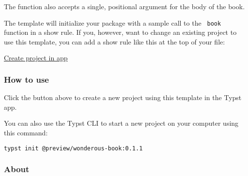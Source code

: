 The function also accepts a single, positional argument for the body of
the book.

The template will initialize your package with a sample call to the
\texttt{\ book\ } function in a show rule. If you, however, want to
change an existing project to use this template, you can add a show rule
like this at the top of your file:

\begin{Shaded}
\begin{Highlighting}[]

\NormalTok{  publishing{-}info: [}


\NormalTok{  ],}
\NormalTok{)}

\end{Highlighting}
\end{Shaded}

\href{/app?template=wonderous-book&version=0.1.1}{Create project in app}

\subsubsection{How to use}\label{how-to-use}

Click the button above to create a new project using this template in
the Typst app.

You can also use the Typst CLI to start a new project on your computer
using this command:

\begin{verbatim}
typst init @preview/wonderous-book:0.1.1
\end{verbatim}



\subsubsection{About}\label{about}

